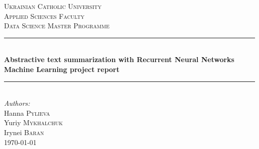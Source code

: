 \begin{titlepage}

\newcommand{\HRule}{\rule{\linewidth}{0.5mm}} %

\center %
 

\textsc{\LARGE Ukrainian Catholic University}\\[1cm] %
\textsc{\Large Applied Sciences Faculty}\\[0.5cm] %
\textsc{\large Data Science Master Programme}\\[0.5cm] %


\HRule \\[0.4cm]
{ \huge \bfseries Abstractive text summarization with Recurrent Neural
	Networks}\\[10pt]
{\Large \bfseries Machine Learning project report}\\[0.4cm] %
\HRule \\[1cm]
 


\Large \emph{Authors:}\\
Hanna \textsc{Pylieva}\\Yuriy \textsc{Mykhalchuk}\\Irynei \textsc{Baran}\\[0.5cm] %


{\large \today}\\[2cm] %


\end{titlepage}
